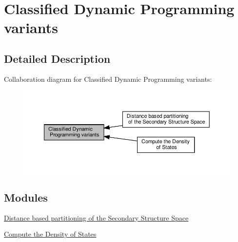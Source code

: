 \hypertarget{group__class__fold}{}\section{Classified Dynamic Programming variants}
\label{group__class__fold}


\subsection{Detailed Description}
Collaboration diagram for Classified Dynamic Programming variants\+:
\nopagebreak
\begin{figure}[H]
\begin{center}
\leavevmode
\includegraphics[width=350pt]{group__class__fold}
\end{center}
\end{figure}
\subsection*{Modules}
\begin{DoxyCompactItemize}
\item 
\hyperlink{group__kl__neighborhood}{Distance based partitioning of the Secondary Structure Space}
\item 
\hyperlink{group__dos}{Compute the Density of States}
\end{DoxyCompactItemize}
